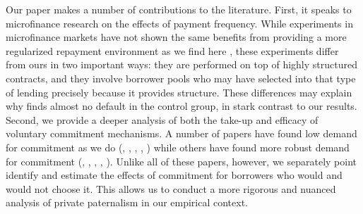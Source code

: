 \documentclass[oneside,11pt]{article}
\begin{document}
Our paper makes a number of contributions to the literature. %
First, it speaks to microfinance research on the effects of payment frequency. While experiments in microfinance markets have not shown the same benefits from providing a more regularized repayment environment as we find here \citep{Pande}, these experiments differ from ours in two important ways: they are performed on top of highly structured contracts, and they involve borrower pools who may have selected into that type of lending precisely because it provides structure. These differences may explain why \citep{Pande} finds almost no default in the control group, in stark contrast to our results. Second, we provide a deeper analysis of both the take-up and efficacy of voluntary commitment mechanisms. A number of papers have found low demand for commitment as we do (\cite{Ashraf}, \cite{Gine}, \cite{Ted}, \cite{Royer}, \cite{Sprenger}) while others have found more robust demand for commitment (\cite{Kremer},  \cite{Casaburi}, \cite{Alcohol}, \cite{AprajitP&P}, \cite{Pascaline}). Unlike all of these papers, however, we separately point identify and estimate the effects of commitment for borrowers who would and would not choose it. This allows us to conduct a more rigorous and nuanced analysis of private paternalism in our empirical context.
\end{document}

